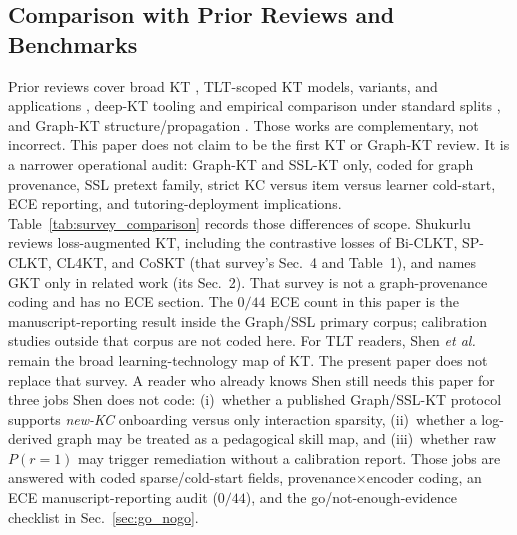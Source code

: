 \documentclass[lettersize,journal]{IEEEtran}
\begin{document}
\subsection{Comparison with Prior Reviews and Benchmarks}
Prior reviews cover broad KT \cite{Abdelrahman_Survey_2023}, TLT-scoped KT models, variants, and applications \cite{Shen_KTSurvey_2024}, deep-KT tooling and empirical comparison under standard splits \cite{Liu_pyKT_2022,Liu_DLKT_2025}, and Graph-KT structure/propagation \cite{Xu_GbKT_2026}. Those works are complementary, not incorrect. This paper does not claim to be the first KT or Graph-KT review. It is a narrower operational audit: Graph-KT and SSL-KT only, coded for graph provenance, SSL pretext family, strict KC versus item versus learner cold-start, ECE reporting, and tutoring-deployment implications. Table~\ref{tab:survey_comparison} records those differences of scope. Shukurlu \cite{Shukurlu_LossKT_2025} reviews loss-augmented KT, including the contrastive losses of Bi-CLKT, SP-CLKT, CL4KT, and CoSKT (that survey's Sec.~4 and Table~1), and names GKT only in related work (its Sec.~2). That survey is not a graph-provenance coding and has no ECE section. The $0/44$ ECE count in this paper is the manuscript-reporting result inside the Graph/SSL primary corpus; calibration studies outside that corpus are not coded here.
For TLT readers, Shen \textit{et al.} remain the broad learning-technology map of KT. The present paper does not replace that survey. A reader who already knows Shen still needs this paper for three jobs Shen does not code: (i)~whether a published Graph/SSL-KT protocol supports \emph{new-KC} onboarding versus only interaction sparsity, (ii)~whether a log-derived graph may be treated as a pedagogical skill map, and (iii)~whether raw $P(r=1)$ may trigger remediation without a calibration report. Those jobs are answered with coded sparse/cold-start fields, provenance$\times$encoder coding, an ECE manuscript-reporting audit ($0/44$), and the go/not-enough-evidence checklist in Sec.~\ref{sec:go_nogo}.
\end{document}
